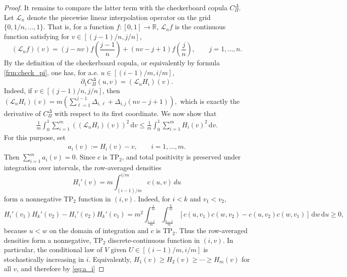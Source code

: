 \documentclass{article}
\theoremstyle{definition}
\newcommand{\de}{\mathrm{\,d}}
\begin{document}
\begin{proof}
    It remains to compare the latter term with the checkerboard copula \(C^\Delta_\Pi\).
    Let \(\mathcal L_n\) denote the piecewise linear interpolation operator on the grid \(\{0,1/n,\ldots,1\}\).
    That is, for a function \(f\colon[0,1]\to\mathbb R\), \(\mathcal L_n f\) is the continuous function satisfying for \(v\in[(j-1)/n,j/n]\),
    \[
        (\mathcal L_n f)(v)
        =
        (j-nv) f\left(\frac{j-1}{n}\right)
        +
        (nv-j+1) f\left(\frac{j}{n}\right),
        \qquad j=1,\ldots,n.
    \]
    By the definition of the checkerboard copula, or equivalently by formula \eqref{frm:check_pi}, one has, for a.e. \(u\in[(i-1)/m,i/m]\),
    \[
        \partial_1 C^\Delta_\Pi(u,v)
        =
        (\mathcal L_n H_i)(v).
    \]
    Indeed, if \(v\in[(j-1)/n,j/n]\), then
    \(
        (\mathcal L_n H_i)(v)
        =
        m\left(
            \sum_{\ell=1}^{j-1}\Delta_{i,\ell}
            +
            \Delta_{i,j}(nv-j+1)
        \right),
    \)
    which is exactly the derivative of \(C^\Delta_\Pi\) with respect to its first coordinate.
    We now show that
    \begin{align}\label{eq:l_n_inequality}
        \frac1m\int_0^1
            \sum_{i=1}^m
            \left((\mathcal L_nH_i)(v)\right)^2\de v
        \le
        \frac1m\int_0^1
            \sum_{i=1}^m H_i(v)^2\de v.
    \end{align}
    For this purpose, set
    \begin{align}\label{eq:a_i}
        a_i(v):=H_i(v)-v,
        \qquad i=1,\dots,m.
    \end{align}
    Then \(\sum_{i=1}^m a_i(v)=0\).
    Since \(c\) is TP$_2$, and total positivity is preserved under integration over intervals, the row-averaged densities
    \[
        H_i'(v)
        =
        m\int_{(i-1)/m}^{i/m} c(u,v)\,du
    \]
    form a nonnegative TP$_2$ function in \((i,v)\).
    Indeed, for \(i<k\) and \(v_1<v_2\),
    \[
    H_i'(v_1)H_k'(v_2)-H_i'(v_2)H_k'(v_1)
    =
    m^2
    \int_{\frac{i-1}m}^{\frac{i}m}
    \int_{\frac{k-1}m}^{\frac{k}m}
    \left[
        c(u,v_1)c(w,v_2)
        -
        c(u,v_2)c(w,v_1)
    \right]\de w\de u
    \ge 0,
    \]
    because \(u<w\) on the domain of integration and \(c\) is TP\(_2\).
    Thus the row-averaged densities form a nonnegative, TP\(_2\) discrete-continuous function in \((i,v)\).
    In particular, the conditional law of \(V\) given \(U\in[(i-1)/m,i/m]\) is stochastically increasing in \(i\).
    Equivalently,
    \(
        H_1(v)\ge H_2(v)\ge \cdots \ge H_m(v)
    \)
    for all \(v\), and therefore by \eqref{eq:a_i}

\end{proof}
\end{document}
